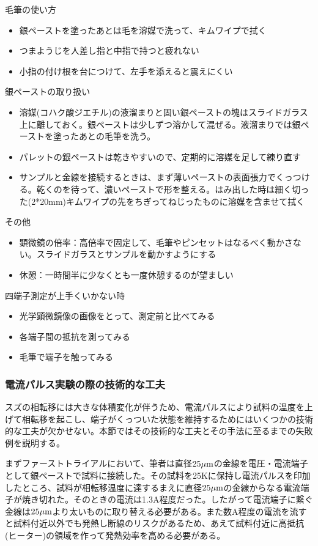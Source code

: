 毛筆の使い方
\begin{itemize}
\item 銀ペーストを塗ったあとは毛を溶媒で洗って、キムワイプで拭く
\item つまようじを人差し指と中指で持つと疲れない
\item 小指の付け根を台につけて、左手を添えると震えにくい
\end{itemize}

銀ペーストの取り扱い
\begin{itemize}
\item 溶媒(コハク酸ジエチル)の液溜まりと固い銀ペーストの塊はスライドガラス上に離しておく。銀ペーストは少しずつ溶かして混ぜる。液溜まりでは銀ペーストを塗ったあとの毛筆を洗う。
\item パレットの銀ペーストは乾きやすいので、定期的に溶媒を足して練り直す
\item サンプルと金線を接続するときは、まず薄いペーストの表面張力でくっつける。乾くのを待って、濃いペーストで形を整える。はみ出した時は細く切った(2*20mm)キムワイプの先をちぎってねじったものに溶媒を含ませて拭く
\end{itemize}

その他
\begin{itemize}
\item 顕微鏡の倍率：高倍率で固定して、毛筆やピンセットはなるべく動かさない。スライドガラスとサンプルを動かすようにする
\item 休憩：一時間半に少なくとも一度休憩するのが望ましい
\end{itemize}

四端子測定が上手くいかない時
\begin{itemize}
\item 光学顕微鏡像の画像をとって、測定前と比べてみる
\item 各端子間の抵抗を測ってみる
\item 毛筆で端子を触ってみる
\end{itemize}

\subsubsection{電流パルス実験の際の技術的な工夫} 
スズの相転移には大きな体積変化が伴うため、電流パルスにより試料の温度を上げて相転移を起こし、端子がくっついた状態を維持するためにはいくつかの技術的な工夫が欠かせない。本節ではその技術的な工夫とその手法に至るまでの失敗例を説明する。

まずファーストトライアルにおいて、筆者は直径$\rm 25 \mu m$の金線を電圧・電流端子として銀ペーストで試料に接続した。その試料を25Kに保持し電流パルスを印加したところ、試料が相転移温度に達するまえに直径$\rm 25 \mu m$の金線からなる電流端子が焼き切れた。そのときの電流は1.3A程度だった。したがって電流端子に繋ぐ金線は$\rm 25 \mu m$より太いものに取り替える必要がある。また数A程度の電流を流すと試料付近以外でも発熱し断線のリスクがあるため、あえて試料付近に高抵抗(ヒーター)の領域を作って発熱効率を高める必要がある。

